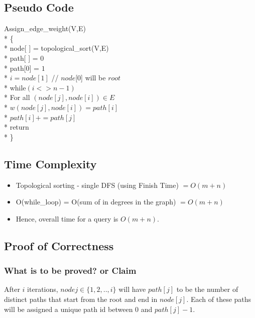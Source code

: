 \documentclass{article}
\begin{document}
\subsection{Pseudo Code}
Assign\_edge\_weight(V,E)	\\*
\{			\\*
	\hspace*{1cm}node[ ] = topological\_sort(V,E) \\*
	\hspace*{1cm}path[ ] = $0$ \\*
	\hspace*{1cm}path[0] = $1$ \\*
	\hspace*{1cm} $i = node[1]$ // $node[0$] will be $root$\\*
	\hspace*{1cm} while$(i <> n-1)$  \\*
	\hspace*{2cm} For all $(node[j], node[i]) \in E$ \\*
	\hspace*{3cm} $w(node[j], node[i]) = path[i]$ \\*
	\hspace*{3cm} $path[i] += path[j]$ \\*
	\hspace*{1cm}return \\*
\}
\subsection{Time Complexity}
\begin{itemize}
\item Topological sorting - single DFS (using Finish Time) $= O(m+n)$
\item O(while\_loop) = O(sum of in degrees in the graph) $= O(m+n)$
\item Hence, overall time for a query is $O(m+n)$. 
\end{itemize}
\subsection{Proof of Correctness}
\subsubsection{What is to be proved? or Claim}
After $i$ iterations, $node j \in \{1,2,..,i\}$ will have $path[j]$ to be the number of distinct paths that start from the root and end in $node[j]$. Each of these paths will be assigned a unique path id between $0$ and $path[j]-1$.  
\end{document}
